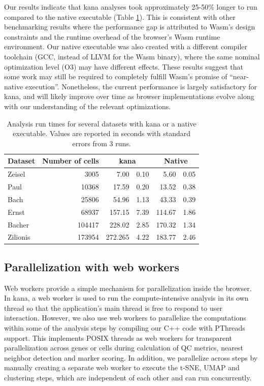 \documentclass{article}
\begin{document}
Our results indicate that kana analyses took approximately 25-50\% longer to run compared to the native executable (Table \ref{tab:times}).
This is consistent with other benchmarking results \cite{jangda2019not}
where the performance gap is attributed to Wasm's design constraints and the runtime overhead of the browser's Wasm runtime environment.
Our native executable was also created with a different compiler toolchain (GCC, instead of LLVM for the Wasm binary),
where the same nominal optimization level (O3) may have different effects.
These results suggest that some work may still be required to completely fulfill Wasm's promise of ``near-native execution''.
Nonetheless, the current performance is largely satisfactory for kana,
and will likely improve over time as browser implementations evolve along with our understanding of the relevant optimizations.

\begin{table}
\caption{Analysis run times for several datasets with kana or a native executable.
Values are reported in seconds with standard errors from 3 runs.}
\label{tab:times}
\begin{center}
    \begin{tabular}{l r r@{ $\pm$ }l r@{ $\pm$ }l}
\hline
Dataset & \multicolumn{1}{c}{Number of cells} & \multicolumn{2}{c}{kana} & \multicolumn{2}{c}{Native} \\
\hline
        Zeisel   & 3005   & 7.00 &  0.10 & 5.60 &  0.05 \\
        Paul     & 10368  & 17.59 &  0.20 & 13.52 &  0.38 \\
        Bach     & 25806  & 54.96 &  1.13 & 43.33 &  0.39 \\
        Ernst    & 68937  & 157.15 & 7.39 & 114.67 & 1.86 \\
        Bacher   & 104417 & 228.02 & 2.85 & 170.32 & 1.34 \\
        Zilionis & 173954 & 272.265 & 4.22 & 183.77 & 2.46 \\
\hline
\end{tabular}
\end{center}
\end{table}

\subsection{Parallelization with web workers}

Web workers provide a simple mechanism for parallelization inside the browser.
In kana, a web worker is used to run the compute-intensive analysis in its own thread so that the application's main thread is free to respond to user interaction.
However, we also use web workers to parallelize the computations within some of the analysis steps by compiling our C++ code with PThreads support.
This implements POSIX threads as web workers for transparent parallelization across genes or cells during calculation of QC metrics, nearest neighbor detection and marker scoring.
In addition, we parallelize across steps by manually creating a separate web worker to execute the t-SNE, UMAP and clustering steps, which are independent of each other and can run concurrently.
\end{document}
